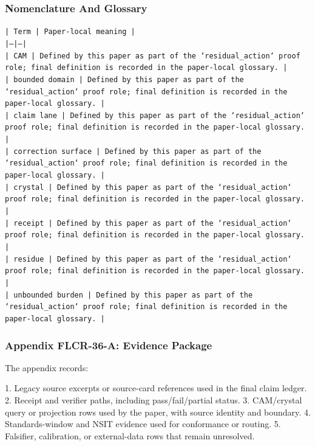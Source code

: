 \documentclass[11pt]{article}
\begin{document}
\subsubsection*{Nomenclature And Glossary}

\noindent\texttt{| Term | Paper-local meaning |}\\
\noindent\texttt{|---|---|}\\
\noindent\texttt{| CAM | Defined by this paper as part of the `residual\_action` proof role; final definition is recorded in the paper-local glossary. |}\\
\noindent\texttt{| bounded domain | Defined by this paper as part of the `residual\_action` proof role; final definition is recorded in the paper-local glossary. |}\\
\noindent\texttt{| claim lane | Defined by this paper as part of the `residual\_action` proof role; final definition is recorded in the paper-local glossary. |}\\
\noindent\texttt{| correction surface | Defined by this paper as part of the `residual\_action` proof role; final definition is recorded in the paper-local glossary. |}\\
\noindent\texttt{| crystal | Defined by this paper as part of the `residual\_action` proof role; final definition is recorded in the paper-local glossary. |}\\
\noindent\texttt{| receipt | Defined by this paper as part of the `residual\_action` proof role; final definition is recorded in the paper-local glossary. |}\\
\noindent\texttt{| residue | Defined by this paper as part of the `residual\_action` proof role; final definition is recorded in the paper-local glossary. |}\\
\noindent\texttt{| unbounded burden | Defined by this paper as part of the `residual\_action` proof role; final definition is recorded in the paper-local glossary. |}\\

\subsubsection*{Appendix FLCR-36-A: Evidence Package}

The appendix records:

1. Legacy source excerpts or source-card references used in the final claim ledger.
2. Receipt and verifier paths, including pass/fail/partial status.
3. CAM/crystal query or projection rows used by the paper, with source identity and boundary.
4. Standards-window and NSIT evidence used for conformance or routing.
5. Falsifier, calibration, or external-data rows that remain unresolved.
\end{document}
